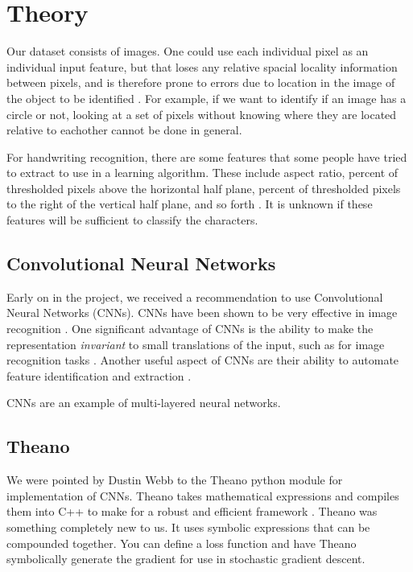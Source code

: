 \section{Theory}

Our dataset consists of images.  One could use each individual pixel as an individual input feature, but that loses any relative spacial locality information between pixels, and is therefore prone to errors due to location in the image of the object to be identified \cite{?}.  For example, if we want to identify if an image has a circle or not, looking at a set of pixels without knowing where they are located relative to eachother cannot be done in general.

For handwriting recognition, there are some features that some people have tried to extract to use in a learning algorithm.  These include aspect ratio, percent of thresholded pixels above the horizontal half plane, percent of thresholded pixels to the right of the vertical half plane, and so forth \cite{?}.  It is unknown if these features will be sufficient to classify the characters.

\subsection{Convolutional Neural Networks}

Early on in the project, we received a recommendation to use Convolutional Neural Networks (CNNs).  CNNs have been shown to be very effective in image recognition \cite{korekado2003convolutional} \cite{ciresan2012multi}.  One significant advantage of CNNs is the ability to make the representation \emph{invariant} to small translations of the input, such as for image recognition tasks \cite{Bengio-et-al-2015-Book}.  Another useful aspect of CNNs are their ability to automate feature identification and extraction \cite{Bengio-et-al-2015-Book}.



CNNs are an example of multi-layered neural networks.

\subsection{Theano}

We were pointed by Dustin Webb to the Theano python module for implementation of CNNs.  Theano takes mathematical expressions and compiles them into C++ to make for a robust and efficient framework \cite{bergstra+al:2010-scipy}.  Theano was something completely new to us.  It uses symbolic expressions that can be compounded together.  You can define a loss function and have Theano symbolically generate the gradient for use in stochastic gradient descent.

